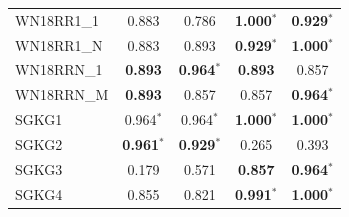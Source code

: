 \begin{table}[t]
{\begin{tabular}{l||cc||cc}
WN18RR1\_1 & 0.883 & 0.786 & \textbf{1.000}$^*$ & \textbf{0.929}$^*$ \\
WN18RR1\_N & 0.883 & 0.893 & \textbf{0.929}$^*$ & \textbf{1.000}$^*$ \\
WN18RRN\_1 & \textbf{0.893} & \textbf{0.964}$^*$ & \textbf{0.893} & 0.857 \\
WN18RRN\_M & \textbf{0.893} & 0.857 & 0.857 & \textbf{0.964}$^*$ \\
\hline
SGKG1 & 0.964$^*$ & 0.964$^*$ & \textbf{1.000}$^*$ & \textbf{1.000}$^*$ \\
SGKG2 & \textbf{0.961}$^*$ & \textbf{0.929}$^*$ & 0.265 & 0.393 \\
SGKG3 & 0.179 & 0.571 & \textbf{0.857} & \textbf{0.964}$^*$ \\
SGKG4 & 0.855 & 0.821 & \textbf{0.991}$^*$ & \textbf{1.000}$^*$ \\
\hline
\end{tabular}%
}
\end{table}
